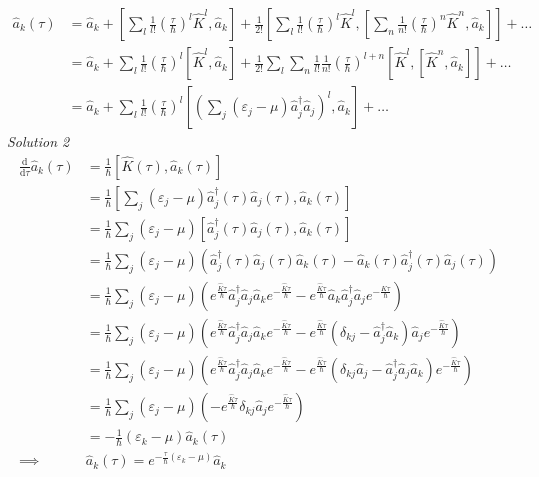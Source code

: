 \documentclass[11pt, a4paper]{article}
\newcommand{\dd}{\mathrm{d}}
\begin{document}
\begin{enumerate}
\begin{align*}
        \hat a_k(\tau) &= \hat a_k + \left[\sum\limits_l \frac{1}{l!}\left(\frac{\tau}{\hbar}\right)^l\hat K^l, \hat a_k\right]
        + \frac{1}{2!} \left[\sum\limits_l \frac{1}{l!}\left(\frac{\tau}{\hbar}\right)^l\hat K^l, \left[\sum\limits_n \frac{1}{n!}\left(\frac{\tau}{\hbar}\right)^n\hat K^n,\hat a_k\right]\right] + \dots
        \\
        & =  \hat a_k + \sum\limits_l \frac{1}{l!}\left(\frac{\tau}{\hbar}\right)^l \left[\hat K^l, \hat a_k\right]
        + \frac{1}{2!} \sum\limits_l\sum\limits_n \frac{1}{l!} \frac{1}{n!} \left(\frac{\tau}{\hbar}\right)^{l+n} \left[\hat K^l, \left[\hat K^n,\hat a_k\right]\right] + \dots
        \\ 
        & = \hat a_k + \sum\limits_l \frac{1}{l!} \left(\frac{\tau}{\hbar}\right)^l \left[ \left(\sum\limits_j(\varepsilon_j-\mu)\hat a_j^{\dagger}\hat a_j\right)^l, \hat a_k \right] + \dots
    \end{align*}
    \subitem \textit{Solution 2}
    \begin{align*}
        \frac{\dd}{\dd\tau}\hat a_k(\tau) &= \frac{1}{\hbar}[\hat K(\tau), \hat a_k(\tau)]\\
        &= \frac{1}{\hbar}\left[
            \sum\limits_j(\varepsilon_j-\mu)\hat a_j^{\dagger}(\tau)\hat a_j(\tau), \hat a_k(\tau)
            \right]\\
        &= \frac{1}{\hbar} \sum\limits_j (\varepsilon_j-\mu)\left[\hat a_j^{\dagger}(\tau)\hat a_j(\tau), \hat a_k(\tau)\right]\\
        &= \frac{1}{\hbar} \sum\limits_j (\varepsilon_j-\mu)\left( \hat a_j^{\dagger}(\tau)\hat a_j(\tau)\hat a_k(\tau) - \hat a_k(\tau)\hat a_j^{\dagger}(\tau)\hat a_j(\tau) \right)\\
        &= \frac{1}{\hbar} \sum\limits_j (\varepsilon_j-\mu)\left( e^{\frac{\hat K\tau}{\hbar}} \hat a_j^{\dagger}\hat a_j\hat a_k e^{-\frac{\hat K\tau}{\hbar}}
        - e^{\frac{\hat K\tau}{\hbar}}\hat a_k\hat a_j^{\dagger}\hat a_je^{-\frac{\hat K\tau}{\hbar}} \right)\\
        &= \frac{1}{\hbar} \sum\limits_j (\varepsilon_j-\mu)\left( e^{\frac{\hat K\tau}{\hbar}} \hat a_j^{\dagger}\hat a_j\hat a_k e^{-\frac{\hat K\tau}{\hbar}}
        - e^{\frac{\hat K\tau}{\hbar}}(\delta_{kj} - \hat a_j^{\dagger}\hat a_k)\hat a_je^{-\frac{\hat K\tau}{\hbar}} \right)\\
        &= \frac{1}{\hbar} \sum\limits_j (\varepsilon_j-\mu)\left( e^{\frac{\hat K\tau}{\hbar}} \hat a_j^{\dagger}\hat a_j\hat a_k e^{-\frac{\hat K\tau}{\hbar}}
        - e^{\frac{\hat K\tau}{\hbar}}(\delta_{kj}\hat a_j - \hat a_j^{\dagger}\hat a_j\hat a_k)e^{-\frac{\hat K\tau}{\hbar}} \right)\\
        &= \frac{1}{\hbar} \sum\limits_j (\varepsilon_j-\mu)\left( - e^{\frac{\hat K\tau}{\hbar}}\delta_{kj}\hat a_je^{-\frac{\hat K\tau}{\hbar}} \right)\\
        &= -\frac{1}{\hbar} (\varepsilon_k - \mu)\hat a_k(\tau)\\
        \implies & \hat a_k(\tau) = e^{-\frac{\tau}{\hbar} (\varepsilon_k - \mu)}\hat a_k
    \end{align*}
    

\end{enumerate}
\end{document}
